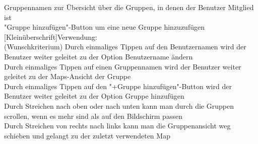 Gruppennamen zur Übersicht über die Gruppen, in denen der Benutzer Mitglied ist\\
"Gruppe hinzufügen"-Button um eine neue Gruppe hinzuzufügen
[Kleinüberschrift]Verwendung:\\
(Wunschkriterium) Durch einmaliges Tippen auf den Benutzernamen wird der Benutzer weiter geleitet zu der Option Benutzername ändern\\
Durch einmaliges Tippen auf einen Gruppennamen wird der Benutzer weiter geleitet zu der Maps-Ansicht der Gruppe\\
Durch einmaliges Tippen auf den "+Gruppe hinzufügen"-Button wird der Benutzer weiter geleitet zu der Option Gruppe hinzufügen\\
Durch Streichen nach oben oder nach unten kann man durch die Gruppen scrollen, wenn es mehr sind als auf den Bildschirm passen\\
Durch Streichen von rechts nach links kann man die Gruppenansicht weg schieben und gelangt zu der zuletzt verwendeten Map\\ \\

